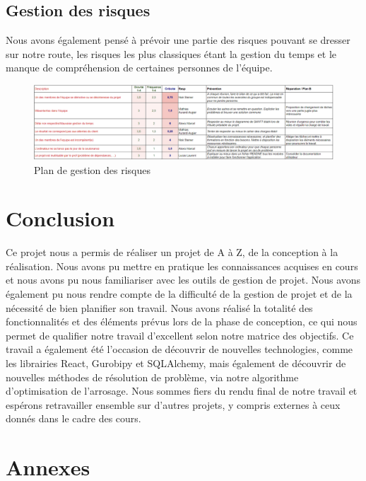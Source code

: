 \documentclass[french,a4paper]{article}
\begin{document}
\subsection{Gestion des risques}
Nous avons également pensé à prévoir une partie des risques pouvant se dresser sur notre route, les risques les plus classiques étant
la gestion du temps et le manque de compréhension de certaines personnes de l'équipe.
\begin{figure}[H]
    \centering
    \includegraphics[width=1\textwidth]{img/Plan_gestion_risque.png}
    \caption{Plan de gestion des risques}
\end{figure}

\section{Conclusion}
Ce projet nous a permis de réaliser un projet de A à Z, de la conception à la réalisation. Nous avons pu mettre en pratique les connaissances acquises en cours et nous avons pu nous familiariser avec les outils de gestion de projet. Nous avons également pu nous rendre compte de la difficulté de la gestion de projet et de la nécessité de bien planifier son travail.
Nous avons réalisé la totalité des fonctionnalités et des éléments prévus lors de la phase de conception, ce qui nous permet de qualifier notre travail d'excellent selon notre matrice des objectifs.
Ce travail a également été l'occasion de découvrir de nouvelles technologies, comme les librairies React, Gurobipy et SQLAlchemy, mais également de découvrir de nouvelles méthodes de résolution de problème, via notre algorithme d'optimisation de l'arrosage.
Nous sommes fiers du rendu final de notre travail et espérons retravailler ensemble sur d'autres projets, y compris externes à ceux donnés dans le cadre des cours.
\section{Annexes}








\end{document}
